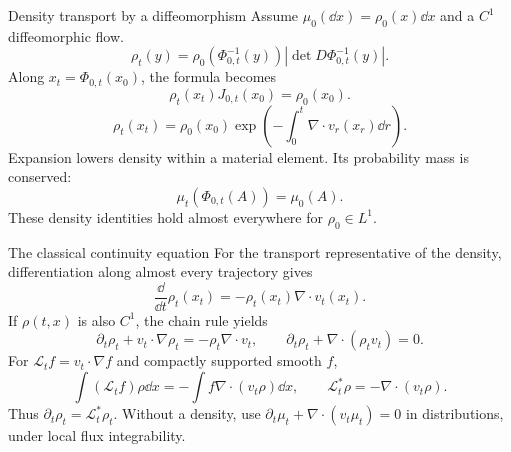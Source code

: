\begin{frame}[t]{Density transport by a diffeomorphism}
\hypertarget{main:density}{}
Assume $\mu_0(\dd x)=\rho_0(x)\dd x$ and a $C^1$ diffeomorphic flow.
\begin{equation*}
  \rho_t(y)=\rho_0(\Phi_{0,t}^{-1}(y))\left|\det D\Phi_{0,t}^{-1}(y)\right|.
\end{equation*}
Along $x_t=\Phi_{0,t}(x_0)$, the formula becomes
\begin{equation*}
  \boxed{\rho_t(x_t)J_{0,t}(x_0)=\rho_0(x_0).}
\end{equation*}
\begin{equation*}
  \rho_t(x_t)=\rho_0(x_0)
  \exp\!\left(-\int_0^t\nabla\cdot v_r(x_r)\dd r\right).
\end{equation*}
Expansion lowers density within a material element. Its probability mass is conserved:
\begin{equation*}
  \mu_t(\Phi_{0,t}(A))=\mu_0(A).
\end{equation*}
These density identities hold almost everywhere for $\rho_0\in L^1$.
\end{frame}

\begin{frame}[t]{The classical continuity equation}
\hypertarget{main:continuity}{}\hypertarget{main:weak}{}
For the transport representative of the density, differentiation along almost every trajectory gives
\begin{equation*}
  \frac{\dd}{\dd t}\rho_t(x_t)=-\rho_t(x_t)\nabla\cdot v_t(x_t).
\end{equation*}
If $\rho(t,x)$ is also $C^1$, the chain rule yields
\begin{equation*}
  \partial_t\rho_t+v_t\cdot\nabla\rho_t=-\rho_t\nabla\cdot v_t,
  \qquad \boxed{\partial_t\rho_t+\nabla\cdot(\rho_tv_t)=0.}
\end{equation*}
For $\mathcal L_t f=v_t\cdot\nabla f$ and compactly supported smooth $f$,
\begin{equation*}
  \int(\mathcal L_t f)\rho\dd x
  =-\int f\nabla\cdot(v_t\rho)\dd x,
  \qquad \mathcal L_t^*\rho=-\nabla\cdot(v_t\rho).
\end{equation*}
Thus $\partial_t\rho_t=\mathcal L_t^*\rho_t$.
Without a density, use $\partial_t\mu_t+\nabla\cdot(v_t\mu_t)=0$ in distributions,
under local flux integrability.
\end{frame}
